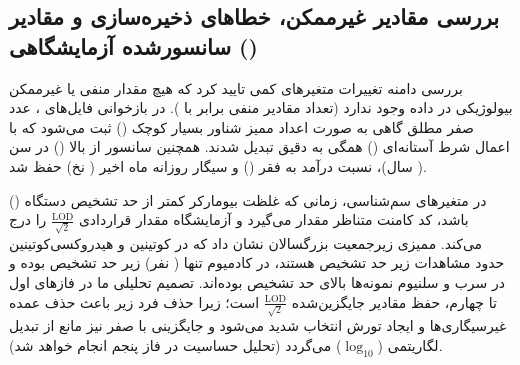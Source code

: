 \documentclass[12pt]{exam}
\begin{document}
\subsection{بررسی مقادیر غیرممکن، خطاهای ذخیره‌سازی و مقادیر سانسورشده آزمایشگاهی ()}
بررسی دامنه تغییرات متغیرهای کمی تایید کرد که هیچ مقدار منفی یا غیرممکن بیولوژیکی در داده وجود ندارد (تعداد مقادیر منفی برابر با ). در بازخوانی فایل‌های ، عدد صفر مطلق گاهی به صورت اعداد ممیز شناور بسیار کوچک () ثبت می‌شود که با اعمال شرط آستانه‌ای () همگی به  دقیق تبدیل شدند. همچنین سانسور از بالا () در سن ( سال)، نسبت درآمد به فقر () و سیگار روزانه ماه اخیر ( نخ) حفظ شد.

در متغیرهای سم‌شناسی، زمانی که غلظت بیومارکر کمتر از حد تشخیص دستگاه () باشد، کد کامنت متناظر مقدار  می‌گیرد و آزمایشگاه  مقدار قراردادی $\frac{\text{LOD}}{\sqrt{2}}$ را درج می‌کند. ممیزی زیرجمعیت بزرگسالان نشان داد که در کوتینین و هیدروکسی‌کوتینین حدود  مشاهدات زیر حد تشخیص هستند، در کادمیوم تنها  ( نفر) زیر حد تشخیص بوده و در سرب و سلنیوم  نمونه‌ها بالای حد تشخیص بوده‌اند. تصمیم تحلیلی ما در فازهای اول تا چهارم، حفظ مقادیر جایگزین‌شده $\frac{\text{LOD}}{\sqrt{2}}$ است؛ زیرا حذف  فرد زیر  باعث حذف عمده غیرسیگاری‌ها و ایجاد تورش انتخاب شدید می‌شود و جایگزینی با صفر نیز مانع از تبدیل لگاریتمی ($\log_{10}$) می‌گردد (تحلیل حساسیت در فاز پنجم انجام خواهد شد).

\begin{table}[htbp]
\centering
\caption{ممیزی مقادیر زیر حد تشخیص آزمایشگاهی () در زیرجمعیت بزرگسالان ( سال و بالاتر)}
\end{table}
\end{document}
